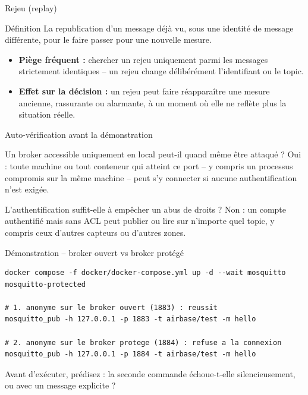 \documentclass[aspectratio=169]{beamer}
\begin{document}
\begin{frame}{Rejeu (replay)}
  \begin{block}{Définition}
    La republication d'un message déjà vu, sous une identité de message différente, pour le faire passer pour une nouvelle mesure.
  \end{block}
  \begin{itemize}
    \item \textbf{Piège fréquent :} chercher un rejeu uniquement parmi les messages strictement identiques -- un rejeu change délibérément l'identifiant ou le topic.
    \item \textbf{Effet sur la décision :} un rejeu peut faire réapparaître une mesure ancienne, rassurante ou alarmante, à un moment où elle ne reflète plus la situation réelle.
  \end{itemize}
\end{frame}

\begin{frame}{Auto-vérification avant la démonstration}
  \small
  \begin{block}{Un broker accessible uniquement en local peut-il quand même être attaqué ?}
    Oui : toute machine ou tout conteneur qui atteint ce port -- y compris un processus compromis sur la même machine -- peut s'y connecter si aucune authentification n'est exigée.
  \end{block}
  \begin{block}{L'authentification suffit-elle à empêcher un abus de droits ?}
    Non : un compte authentifié mais sans ACL peut publier ou lire sur n'importe quel topic, y compris ceux d'autres capteurs ou d'autres zones.
  \end{block}
\end{frame}

\begin{frame}[fragile]{Démonstration -- broker ouvert vs broker protégé}
  \scriptsize
  \begin{verbatim}
docker compose -f docker/docker-compose.yml up -d --wait mosquitto mosquitto-protected

# 1. anonyme sur le broker ouvert (1883) : reussit
mosquitto_pub -h 127.0.0.1 -p 1883 -t airbase/test -m hello

# 2. anonyme sur le broker protege (1884) : refuse a la connexion
mosquitto_pub -h 127.0.0.1 -p 1884 -t airbase/test -m hello
  \end{verbatim}
  \normalsize
  Avant d'exécuter, prédisez : la seconde commande échoue-t-elle silencieusement, ou avec un message explicite ?
\end{frame}
\end{document}
